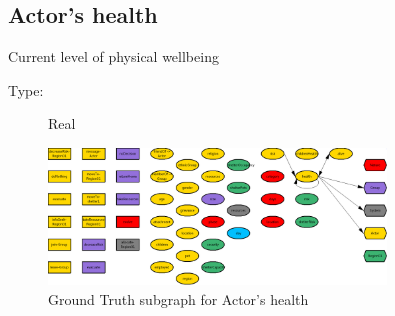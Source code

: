 \documentclass{article}%
\begin{document}
%
\subsection{Actor's health}%
\label{subsec:Actor's health}%
Current level of physical wellbeing%
\begin{description}%
\item[Type:]%
Real%
\end{description}%


\begin{figure}[ht]%
\centering%
\includegraphics[width=0.8\textwidth]{images/healthOfActor.png}%
\caption{Ground Truth subgraph for Actor's health}%
\end{figure}

%
\end{document}
